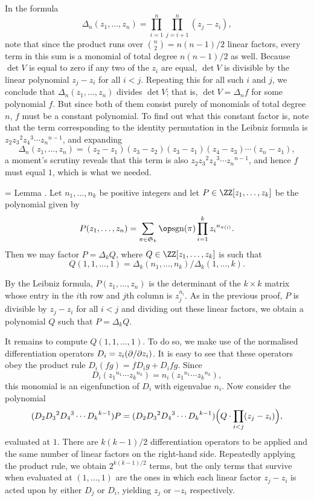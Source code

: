 In the formula
$$\Delta_n(z_1,\ldots,z_n) = \prod_{i=1}^n \prod_{j=i+1}^n (z_j-z_i),$$
note that since the product runs over ${n\choose 2} = n(n-1)/2$ linear factors, every term in this sum
is a monomial of total degree $n(n-1)/2$ as well. Because $\det V$ is equal to zero if any two
of the $z_i$ are equal, $\det V$ is divisible by
the linear polynomial $z_j-z_i$ for all $i < j$. Repeating this for all such $i$ and $j$, we
conclude that $\Delta_n(z_1,\ldots,z_n)$ divides $\det V$; that is,
$\det V = \Delta_n f$ for some polynomial $f$. But since both of them consist purely of
monomials of total degree $n$, $f$ must be a constant polynomial. To find out what this
constant factor is, note that the term corresponding to the identity permutation in the Leibniz formula
is $z_2{z_3}^2{z_4}^3\cdots {z_n}^{n-1}$, and expanding
$$\Delta_n(z_1,\ldots,z_n) = (z_2-z_1)(z_3-z_2)(z_3-z_1)(z_4-z_3)\cdots(z_n-z_{1}),$$
a moment's scrutiny reveals that this term is also $z_2{z_3}^2{z_4}^3\cdots {z_n}^{n-1}$, and hence
$f$ must equal $1$, which is what we needed.\slug

\newcount\vandermonde
\vandermonde=\thmcount
\proclaim Lemma \advthm. Let $n_1,\ldots, n_k$ be positive integers and let $P\in \ZZ[z_1,\ldots,z_k]$
be the polynomial given by
$$ P(z_1,\ldots,z_n) = \sum_{\pi\in {\frak S}_k} \sgn(\pi) \prod_{i=1}^k {z_i}^{n_{\pi(i)}}.$$
Then we may factor $P = \Delta_k Q$, where $Q\in \ZZ[z_1,\ldots,z_k]$ is such that
$$Q(1,1,\ldots,1) = \Delta_k(n_1, \ldots, n_k) / \Delta_k(1,\ldots,k).$$

\proof By the Leibniz formula, $P(z_1,\ldots,z_n)$ is the determinant of
the $k\times k$ matrix whose entry in the $i$th row and $j$th column is $z_j^{n_i}$. As in the previous
proof, $P$ is divisible by $z_j-z_i$ for all $i<j$ and dividing out these linear factors, we obtain
a polynomial $Q$ such that $P = \Delta_k Q$.

It remains to compute $Q(1,1,\ldots,1)$. To do so, we make use of the normalised differentiation operators
$D_i = z_i(\partial /\partial z_i)$.
It is easy to see that these operators obey the product rule $D_i(fg) = fD_ig+ D_if g$. Since
$$D_i({z_1}^{n_1} \cdots {z_k}^{n_k}) = n_i ({z_1}^{n_1} \cdots {z_k}^{n_k}),$$
this monomial is an eigenfunction of $D_i$ with eigenvalue $n_i$. Now consider the polynomial
$$(D_2 {D_3}^2 {D_4}^3 \cdots {D_k}^{k-1}) P = 
(D_2 {D_3}^2 {D_4}^3 \cdots {D_k}^{k-1}) \Bigl(Q \cdot \prod_{i<j} (z_j-z_i)\Bigr),$$
evaluated at $1$. There are $k(k-1)/2$ differentiation operators to be applied and the same
number of linear factors on the right-hand side. Repeatedly applying the product rule, we obtain
$2^{k(k-1)/2}$ terms, but
the only terms that survive when evaluated at $(1,\ldots,1)$ are the ones in which each
linear factor $z_j-z_i$ is acted upon by either $D_j$ or $D_i$, yielding $z_j$ or $-z_i$ respectively.

